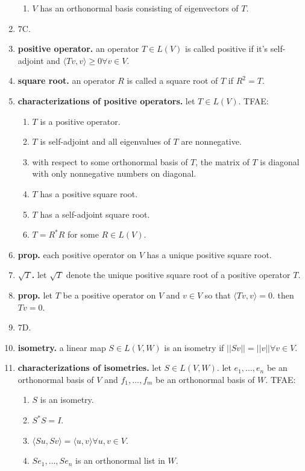 \begin{enumerate}
\begin{enumerate}
		\item $V$ has an orthonormal basis consisting of eigenvectors of $T$. 
	\end{enumerate}
	\item 7C. 
	\item \textbf{positive operator. } an operator $T \in L(V)$ is called positive if it's self-adjoint and $\langle Tv,v \rangle \geq 0 \forall v \in V$. 
	\item \textbf{square root. } an operator $R$ is called a square root of $T$ if $R^2 = T$. 
	\item \textbf{characterizations of positive operators. } let $T \in L(V)$. TFAE: 
	\begin{enumerate}
		\item $T$ is a positive operator. 
		\item $T$ is self-adjoint and all eigenvalues of $T$ are nonnegative. 
		\item with respect to some orthonormal basis of $T$, the matrix of $T$ is diagonal with only nonnegative numbers on diagonal. 
		\item $T$ has a positive square root. 
		\item $T$ has a self-adjoint square root. 
		\item $T=R^*R$ for some $R \in L(V)$. 
	\end{enumerate}
	\item \textbf{prop. } each positive operator on $V$ has a unique positive square root. 
	\item \textbf{$\sqrt{T}$. } let $\sqrt{T}$ denote the unique positive square root of a positive operator $T$. 
	\item \textbf{prop. } let $T$ be a positive operator on $V$ and $v \in V$ so that $\langle Tv,v \rangle = 0$. then $Tv =0$. 
	\item 7D. 
	\item \textbf{isometry. } a linear map $S \in L(V,W)$ is an isometry if $||Sv|| = ||v|| \forall v \in V$. 
	\item \textbf{characterizations of isometries. } let $S \in L(V,W)$. let $e_1,\dots,e_n$ be an orthonormal basis of $V$ and $f_1,\dots,f_m$ be an orthonormal basis of $W$. TFAE: 
	\begin{enumerate}
		\item $S$ is an isometry. 
		\item $S^*S = I$. 
		\item $\langle Su,Sv \rangle = \langle u,v \rangle \forall u,v \in V$. 
		\item $Se_1,\dots,Se_n$ is an orthonormal list in $W$. 

\end{enumerate}
\end{enumerate}

